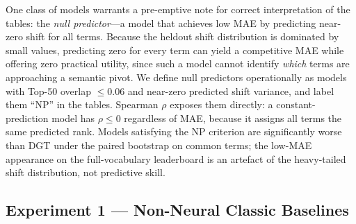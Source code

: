 \documentclass[12pt]{article}
\begin{document}
One class of models warrants a pre-emptive note for correct interpretation of the tables: the \textit{null predictor}---a model that achieves low MAE by predicting near-zero shift for all terms. Because the heldout shift distribution is dominated by small values, predicting zero for every term can yield a competitive MAE while offering zero practical utility, since such a model cannot identify \textit{which} terms are approaching a semantic pivot. We define null predictors operationally as models with Top-50 overlap $\leq 0.06$ and near-zero predicted shift variance, and label them ``NP'' in the tables. Spearman $\rho$ exposes them directly: a constant-prediction model has $\rho \leq 0$ regardless of MAE, because it assigns all terms the same predicted rank. Models satisfying the NP criterion are significantly worse than DGT under the paired bootstrap on common terms; the low-MAE appearance on the full-vocabulary leaderboard is an artefact of the heavy-tailed shift distribution, not predictive skill.

\subsection{Experiment 1 --- Non-Neural Classic Baselines}
\end{document}
